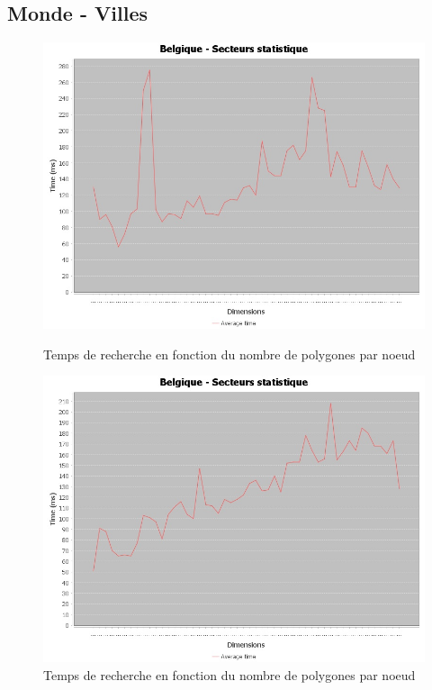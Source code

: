 \documentclass {article}
\begin{document}
\newpage
\subsection {Monde - Villes}\label{mondeVilles}
\begin{figure}[h]
    \begin{minipage}[t]{0.46\textwidth}
	\centering
	\includegraphics[width=\textwidth]{graph_lineaire_Belgique.png}
	\caption{Temps de recherche en fonction du nombre de polygones par noeud}
	\label{fig:belgique_stat_find_lin}
    \end{minipage}
    \begin{minipage}[t]{0.46\textwidth}
	\centering
	\includegraphics[width=\textwidth]{graph_quadratique_Belgique.png}
	\caption{Temps de recherche en fonction du nombre de polygones par noeud}
	\label{fig:belgique_stat_find_quad}
    \end{minipage}
\end{figure}
\end{document}
